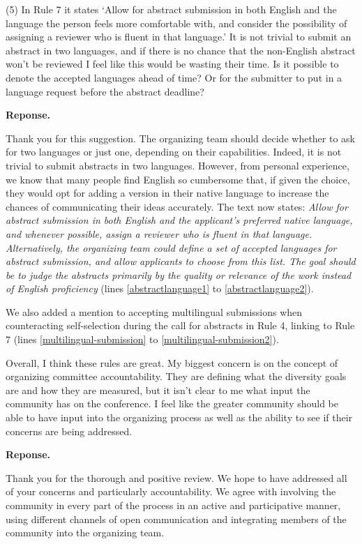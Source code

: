 \documentclass{article}
\newenvironment{Reply}{\noindent\color{BlueViolet}\textbf{Reponse.}}{\vspace{1em}}
\begin{document}
(5) In Rule 7 it states `Allow for abstract submission in both English and the language the person feels more comfortable with, and consider the possibility of assigning a reviewer who is fluent in that language.' It is not trivial to submit an abstract in two languages, and if there is no chance that the non-English abstract won't be reviewed I feel like this would be wasting their time. Is it possible to denote the accepted languages ahead of time? Or for the submitter to put in a language request before the abstract deadline?

\begin{Reply}

    Thank you for this suggestion. 
    The organizing team should decide whether to ask for two languages or just one, depending on their capabilities. 
    Indeed, it is not trivial to submit abstracts in two languages. However, from personal experience, we know that many people find English so cumbersome that, if given the choice, they would opt for adding a version in their native language to increase the chances of communicating their ideas accurately. 
    The text now states: 
    \textit{Allow for abstract submission in both English and the applicant's preferred native language, and whenever possible, assign a reviewer who is fluent in that language. 
    Alternatively, the organizing team could define a set of accepted languages for abstract submission, and allow applicants to choose from this list. 
    The goal should be to judge the abstracts primarily by the quality or relevance of the work instead of English proficiency} (lines \ref{abstractlanguage1} to \ref{abstractlanguage2}).
    
    We also added a mention to accepting multilingual submissions when counteracting self-selection during the call for abstracts in Rule 4, linking to Rule 7 (lines \ref{multilingual-submission} to \ref{multilingual-submission2}).
\end{Reply}

Overall, I think these rules are great. My biggest concern is on the concept of organizing committee accountability. They are defining what the diversity goals are and how they are measured, but it isn't clear to me what input the community has on the conference. I feel like the greater community should be able to have input into the organizing process as well as the ability to see if their concerns are being addressed.


\begin{Reply}

    Thank you for the thorough and positive review. We hope to have addressed all of your concerns and particularly accountability. We agree with involving the community in every part of the process in an active and participative manner, using different channels of open communication and integrating members of the community into the organizing team. 
\end{Reply}
\end{document}
